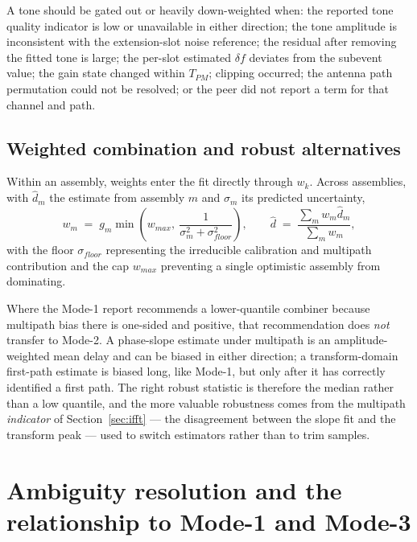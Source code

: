 \documentclass[11pt,a4paper]{article}
\newcommand{\Tpm}{T_{PM}}
\begin{document}
A tone should be gated out or heavily down-weighted when: the reported tone quality indicator is low
or unavailable in either direction; the tone amplitude is inconsistent with the extension-slot noise
reference; the residual after removing the fitted tone is large; the per-slot estimated $\delta f$
deviates from the subevent value; the gain state changed within $\Tpm$; clipping occurred; the
antenna path permutation could not be resolved; or the peer did not report a term for that channel
and path.

\subsection{Weighted combination and robust alternatives}

Within an assembly, weights enter the fit directly through $w_k$. Across assemblies, with $\hat d_m$
the estimate from assembly $m$ and $\sigma_m$ its predicted uncertainty,
\begin{equation}
w_m \;=\; g_m \min\!\left(w_{max},\ \frac{1}{\sigma_m^2+\sigma_{floor}^2}\right),
\qquad
\hat d \;=\; \frac{\sum_m w_m \hat d_m}{\sum_m w_m},
\label{eq:agg}
\end{equation}
with the floor $\sigma_{floor}$ representing the irreducible calibration and multipath contribution
and the cap $w_{max}$ preventing a single optimistic assembly from dominating.

Where the Mode-1 report recommends a lower-quantile combiner because multipath bias there is
one-sided and positive, that recommendation does \emph{not} transfer to Mode-2. A phase-slope
estimate under multipath is an amplitude-weighted mean delay and can be biased in either direction; a
transform-domain first-path estimate is biased long, like Mode-1, but only after it has correctly
identified a first path. The right robust statistic is therefore the median rather than a low
quantile, and the more valuable robustness comes from the multipath \emph{indicator} of
Section~\ref{sec:ifft} --- the disagreement between the slope fit and the transform peak --- used to
switch estimators rather than to trim samples.

\section{Ambiguity resolution and the relationship to Mode-1 and Mode-3}
\label{sec:fusion}
\end{document}

